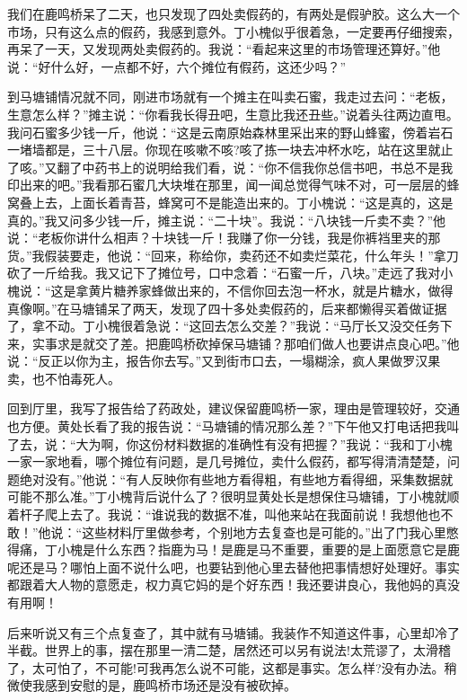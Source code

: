 \documentclass[12pt,oneside]{book}
\begin{document}
我们在鹿鸣桥呆了二天，也只发现了四处卖假药的，有两处是假驴胶。这么大一个市场，只有这么点的假药，我感到意外。丁小槐似乎很着急，一定要再仔细搜索，再呆了一天，又发现两处卖假药的。我说：``看起来这里的市场管理还算好。''他说：``好什么好，一点都不好，六个摊位有假药，这还少吗？''

到马塘铺情况就不同，刚进市场就有一个摊主在叫卖石蜜，我走过去问：``老板，生意怎么样？''摊主说：``你看我长得丑吧，生意比我还丑些。''说着头往两边直甩。我问石蜜多少钱一斤，他说：``这是云南原始森林里采出来的野山蜂蜜，傍着岩石一堵墙都是，三十八层。你现在咳嗽不咳?咳了拣一块去冲杯水吃，站在这里就止了咳。''又翻了中药书上的说明给我们看，说：``你不信我你总信书吧，书总不是我印出来的吧。''我看那石蜜几大块堆在那里，闻一闻总觉得气味不对，可一层层的蜂窝叠上去，上面长着青苔，蜂窝可不是能造出来的。丁小槐说：``这是真的，这是真的。''我又问多少钱一斤，摊主说：``二十块''。我说：``八块钱一斤卖不卖？''他说：``老板你讲什么相声？十块钱一斤！我赚了你一分钱，我是你裤裆里夹的那货。''我假装要走，他说：``回来，称给你，卖药还不如卖烂菜花，什么年头！''拿刀砍了一斤给我。我又记下了摊位号，口中念着：``石蜜一斤，八块。''走远了我对小槐说：``这是拿黄片糖养家蜂做出来的，不信你回去泡一杯水，就是片糖水，做得真像啊。''在马塘铺呆了两天，发现了四十多处卖假药的，后来都懒得买着做证据了，拿不动。丁小槐很着急说：``这回去怎么交差？''我说：``马厅长又没交任务下来，实事求是就交了差。把鹿鸣桥砍掉保马塘铺？那咱们做人也要讲点良心吧。''他说：``反正以你为主，报告你去写。''又到街市口去，一塌糊涂，疯人果做罗汉果卖，也不怕毒死人。

回到厅里，我写了报告给了药政处，建议保留鹿鸣桥一家，理由是管理较好，交通也方便。黄处长看了我的报告说：``马塘铺的情况那么差？''下午他又打电话把我叫了去，说：``大为啊，你这份材料数据的准确性有没有把握？''我说：``我和丁小槐一家一家地看，哪个摊位有问题，是几号摊位，卖什么假药，都写得清清楚楚，问题绝对没有。''他说：``有人反映你有些地方看得粗，有些地方看得细，采集数据就可能不那么准。''丁小槐背后说什么了？很明显黄处长是想保住马塘铺，丁小槐就顺着杆子爬上去了。我说：``谁说我的数据不准，叫他来站在我面前说！我想他也不敢！''他说：``这些材料厅里做参考，个别地方去复查也是可能的。''出了门我心里憋得痛，丁小槐是什么东西？指鹿为马！是鹿是马不重要，重要的是上面愿意它是鹿呢还是马？哪怕上面不说什么吧，也要钻到他心里去替他把事情想好处理好。事实都跟着大人物的意愿走，权力真它妈的是个好东西！我还要讲良心，我他妈的真没有用啊！

后来听说又有三个点复查了，其中就有马塘铺。我装作不知道这件事，心里却冷了半截。世界上的事，摆在那里一清二楚，居然还可以另有说法!太荒谬了，太滑稽了，太可怕了，不可能!可我再怎么说不可能，这都是事实。怎么样?没有办法。稍微使我感到安慰的是，鹿鸣桥市场还是没有被砍掉。
\end{document}
